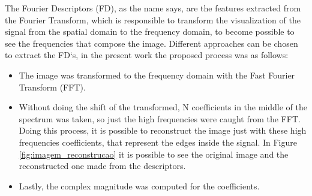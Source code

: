 \documentclass[conference]{IEEEtran}
\begin{document}
		\par The Fourier Descriptors (FD), as the name says, are the features extracted from the Fourier Transform, which is responsible to transform the visualization of the signal from the spatial domain to the frequency domain, to become possible to see the frequencies that compose the image. Different approaches can be chosen to extract the FD`s, in the present work the proposed process was as follows:
		\begin{itemize}
            \item The image was transformed to the frequency domain with the Fast Fourier Transform (FFT).
			\item Without doing the shift of the transformed, N coefficients in the middle of the spectrum was taken, so just the high frequencies were caught from the FFT. Doing this process, it is possible to reconstruct the image just with these high frequencies coefficients, that represent the edges inside the signal. In Figure \ref{fig:imagem_reconstrucao} it is possible to see the original image and the reconstructed one made from the descriptors.
			\item Lastly, the complex magnitude was computed for the coefficients.
		\end{itemize}
		
\end{document}
